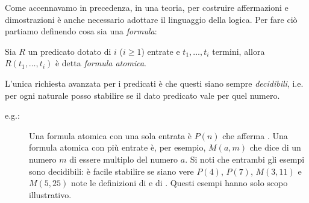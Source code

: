 		Come accennavamo in precedenza, in una teoria, per costruire affermazioni e dimostrazioni è anche necessario adottare il linguaggio della logica. Per fare ciò partiamo definendo cosa sia una \emph{formula}:
		 
	\begin{defin}
		Sia $R$ un predicato dotato di $i$ ($i\geq1$) entrate e $t_{1}, \ldots, t_{i}$ termini, allora $R(t_{1}, \ldots, t_{i})$ è detta \emph{formula atomica}. 
	\end{defin}
		L'unica richiesta avanzata per i predicati è che questi siano sempre \emph{decidibili}, i.e. per ogni naturale posso stabilire se il dato predicato vale per quel numero.
	\begin{description}
		\item[e.g.:] Una formula atomica con una sola entrata è $P(n)$ che afferma . Una formula atomica con più entrate è, per esempio, $M(a,m)$ che dice di un numero $m$ di essere multiplo del numero $a$. Si noti che entrambi gli esempi sono decidibili: è facile stabilire se siano vere $P(4)$, $P(7)$, $M(3,11)$ e $M(5,25)$ note le definizioni di  e di . Questi esempi hanno solo scopo illustrativo.
	\end{description}
	
